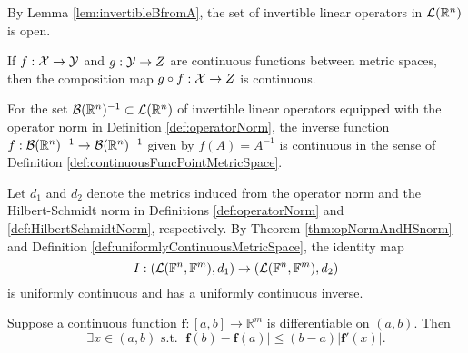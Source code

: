 \begin{exm}
  \label{exm:invertibleOpSetIsOpen}
  By Lemma \ref{lem:invertibleBfromA},
  the set of invertible linear operators in ${\cal L}(\mathbb{R}^n)$
  is open.
\end{exm}

\begin{lem}
  \label{lem:compositionMapIsContinuous}
  If $f:{\cal X}\rightarrow {\cal Y}$ and $g:{\cal Y}\rightarrow Z$
  are continuous functions between metric spaces,
  then the composition map $g\circ f: {\cal X}\rightarrow Z$
  is continuous.
\end{lem}

\begin{lem}
  \label{lem:funcInverseIsContinuous}
  For the set ${\cal B}(\mathbb{R}^n)^{-1}\subset
  {\cal L}(\mathbb{R}^n)$
  of invertible linear operators equipped
  with the operator norm in Definition \ref{def:operatorNorm},
  the inverse function 
  $f: {\cal B}(\mathbb{R}^n)^{-1}\rightarrow
  {\cal B}(\mathbb{R}^n)^{-1}$ 
  given by $f(A) = A^{-1}$ is continuous
  in the sense of Definition \ref{def:continuousFuncPointMetricSpace}.
\end{lem}


\begin{exm}
  \label{exm:identityUniformlyCont}
  Let $d_1$ and $d_2$ denote the metrics
  induced from the operator norm and the Hilbert-Schmidt norm
  in Definitions \ref{def:operatorNorm} and
  \ref{def:HilbertSchmidtNorm}, respectively.
  By Theorem \ref{thm:opNormAndHSnorm}
  and Definition \ref{def:uniformlyContinuousMetricSpace}, 
  the identity map
  \begin{equation}
    \label{eq:identityUniformlyCont}
    I: \left({\cal L}(\mathbb{F}^n,\mathbb{F}^m), d_1\right)
    \rightarrow
    \left({\cal L}(\mathbb{F}^n,\mathbb{F}^m), d_2\right)
  \end{equation}
  is uniformly continuous and has a uniformly continuous inverse.
\end{exm}


\begin{thm}
  \label{thm:vectorMeanValue}
  Suppose a continuous function $\mathbf{f}: [a,b]\rightarrow \mathbb{R}^m$
  is differentiable on $(a,b)$. Then 
  \begin{equation}
    \label{eq:vectorMeanValue}
    \exists x\in(a,b) \text{ s.t. }
    |\mathbf{f}(b)-\mathbf{f}(a)|\le (b-a)|\mathbf{f}'(x)|.
  \end{equation}
\end{thm}


